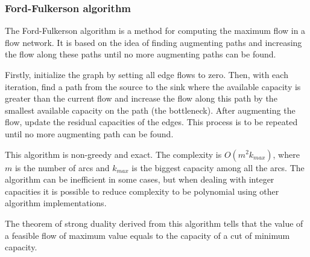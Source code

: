 \subsubsection{Ford-Fulkerson algorithm}

The Ford-Fulkerson algorithm is a method for computing the maximum flow in a flow network. It is based on the idea of finding augmenting paths and increasing the flow along these paths until no more augmenting paths can be found.

Firstly, initialize the graph by setting all edge flows to zero.
Then, with each iteration, find a path from the source to the sink where the available capacity is greater than the current flow and increase the flow along this path by the smallest available capacity on the path (the bottleneck).
After augmenting the flow, update the residual capacities of the edges.
This process is to be repeated until no more augmenting path can be found.

This algorithm is non-greedy and exact.
The complexity is $O(m^2k_{max})$, where $m$ is the number of arcs and $k_{max}$ is the biggest capacity among all the arcs.
The algorithm can be inefficient in some cases, but when dealing with integer capacities it is possible to reduce complexity to be polynomial using other algorithm implementations.

\newpar
The theorem of strong duality derived from this algorithm tells that the value of a feasible flow of maximum value equals to the capacity of a cut of minimum capacity.
